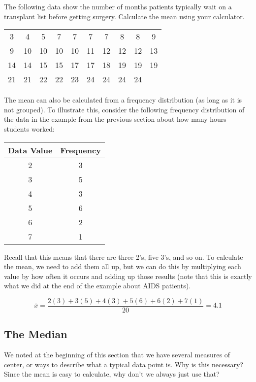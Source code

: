 \begin{try}
The following data show the number of months patients typically wait on a transplant list before getting surgery. Calculate the mean using your calculator.
\begin{center}
\begin{tabular}{c c c c c c c c c c}
3 & 4 & 5 & 7 & 7 & 7 & 7 & 8 & 8 & 9\\
9 & 10 & 10 & 10 & 10 & 11 & 12 & 12 & 12 & 13\\
14 & 14 & 15 & 15 & 17 & 17 & 18 & 19 & 19 & 19\\
21 & 21 & 22 & 22 & 23 & 24 & 24 & 24 & 24
\end{tabular}
\end{center}
\end{try}

The mean can also be calculated from a frequency distribution (as long as it is not grouped).  To illustrate this, consider the following frequency distribution of the data in the example from the previous section about how many hours students worked:
\begin{center}
\begin{tabular}{c | c}
\textbf{Data Value} & \textbf{Frequency}\\
\hline
2 & 3\\
3 & 5\\
4 & 3\\
5 & 6\\
6 & 2\\
7 & 1
\end{tabular}
\end{center}

Recall that this means that there are three 2's, five 3's, and so on.  To calculate the mean, we need to add them all up, but we can do this by multiplying each value by how often it occurs and adding up those results (note that this is exactly what we did at the end of the example about AIDS patients).

\[\overline{x} = \dfrac{2(3)+3(5)+4(3)+5(6)+6(2)+7(1)}{20} = 4.1\]
\vfill
\pagebreak

\subsection{The Median}
We noted at the beginning of this section that we have several measures of center, or ways to describe what a typical data point is.  Why is this necessary?  Since the mean is easy to calculate, why don't we always just use that?

